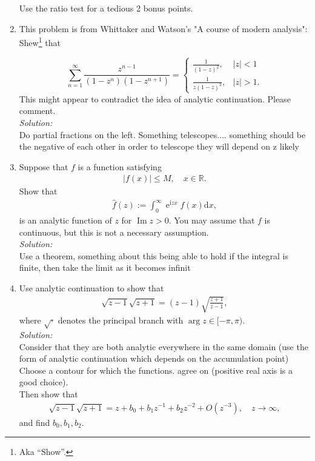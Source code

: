 \documentclass[10pt]{amsart}
\newcommand{\D}{\mathrm{d}}
\newcommand{\I}{\mathrm{i}}
\DeclareMathOperator{\E}{e}
\DeclareMathOperator{\imag}{Im}
\theoremstyle{nonumberplain}
\begin{document}
\begin{enumerate}[label={\bf {\arabic*}:}]
\noindent
Use the ratio test for a tedious 2 bonus points.

\newpage

\item This problem is from Whittaker and Watson's "A course of modern
  analysis": Shew\footnote{Aka ``Show''.} that

$$
\sum_{n=1}^{\infty} \frac{z^{n-1}}{\left(1-z^n\right)\left(1-z^{n+1}\right)}= \begin{cases}\frac{1}{(1-z)^2}, & |z|<1 \\ \frac{1}{z(1-z)^2}, & |z|>1 .\end{cases}
$$
This might appear to contradict the idea of analytic
continuation. Please comment.\\
\textit{Solution:} \\
Do partial fractions on the left.
Something telescopes.... something should be the negative of each other in order to telescope they will depend on z likely
\newpage

\item Suppose that $f$ is a function satisfying
  \begin{align*}
    |f(x)| \leq M, \quad x \in \mathbb R.
  \end{align*}
  Show that
  \begin{align*}
    \hat f(z) := \int_0^\infty \E^{\I z x} f(x) \D x,
  \end{align*}
  is an analytic function of $z$ for $\imag z > 0$.  You may assume
  that $f$ is continuous, but this is not a necessary assumption.\\
  
\noindent
\textit{Solution:} \\
Use a theorem, something about this being able to hold if the integral is finite, then take the limit as it becomes infinit
\newpage

\item Use analytic continuation to show that
  \begin{align*}
    \sqrt{z -1} \sqrt{z + 1} = (z -1) \sqrt{ \frac{ z +1}{z-1}},
  \end{align*}
  where $\sqrt{\cdot}$ denotes the principal branch with $\arg z \in
  [-\pi, \pi)$. \\
  \textit{Solution:} \\
  Consider that they are both analytic everywhere in the same domain (use the form of analytic continuation which depends on the accumulation point) \\
  Choose a contour for which the functions. agree on (positive real axis is a good choice). \\
  
  \noindent
  Then show that
  \begin{align*}
    \sqrt{z -1} \sqrt{z + 1} = z + b_0 + b_1 z^{-1} + b_2  z^{-2} +
    O(z^{-3}), \quad z \to \infty,
  \end{align*}
  and find $b_0,b_1,b_2$.
  
\end{enumerate}
\end{document}
